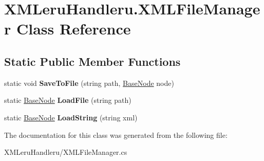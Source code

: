 \hypertarget{class_x_m_leru_handleru_1_1_x_m_l_file_manager}{}\section{X\+M\+Leru\+Handleru.\+X\+M\+L\+File\+Manager Class Reference}
\label{class_x_m_leru_handleru_1_1_x_m_l_file_manager}
\subsection*{Static Public Member Functions}
\begin{DoxyCompactItemize}
\item 
\hypertarget{class_x_m_leru_handleru_1_1_x_m_l_file_manager_af518835562c9dc0e93f2f737923a0935}{}static void {\bfseries Save\+To\+File} (string path, \hyperlink{class_x_m_leru_handleru_1_1_base_node}{Base\+Node} node)\label{class_x_m_leru_handleru_1_1_x_m_l_file_manager_af518835562c9dc0e93f2f737923a0935}

\item 
\hypertarget{class_x_m_leru_handleru_1_1_x_m_l_file_manager_a2e3dfed69563014bb11b61699ce76799}{}static \hyperlink{class_x_m_leru_handleru_1_1_base_node}{Base\+Node} {\bfseries Load\+File} (string path)\label{class_x_m_leru_handleru_1_1_x_m_l_file_manager_a2e3dfed69563014bb11b61699ce76799}

\item 
\hypertarget{class_x_m_leru_handleru_1_1_x_m_l_file_manager_af04699e6a4e0195b2e408e52aab1eaee}{}static \hyperlink{class_x_m_leru_handleru_1_1_base_node}{Base\+Node} {\bfseries Load\+String} (string xml)\label{class_x_m_leru_handleru_1_1_x_m_l_file_manager_af04699e6a4e0195b2e408e52aab1eaee}

\end{DoxyCompactItemize}


The documentation for this class was generated from the following file\+:\begin{DoxyCompactItemize}
\item 
X\+M\+Leru\+Handleru/X\+M\+L\+File\+Manager.\+cs\end{DoxyCompactItemize}
